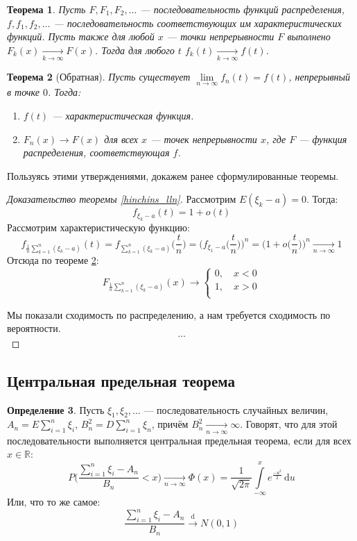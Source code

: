 \documentclass[11pt,openany,a4paper]{scrartcl}
\theoremstyle{plain}
\newtheorem{theorem}{Теорема}[subsection]
\theoremstyle{definition}
\newtheorem{definition}[theorem]{Определение}
\newcommand\mb{\mathbb}
\newcommand\real{\mb R}
\newcommand{\underto}[1]{\xrightarrow[#1]{}}
\newcommand{\overto}[1]{\xrightarrow{#1}}
\newcommand{\dif}{\, \mathrm d}
\begin{document}
\begin{theorem}
    Пусть $F, F_1, F_2, \ldots$ — последовательность функций распределения,
    $f, f_1, f_2, \ldots$ — последовательность соответствующих им 
    характеристических функций. Пусть также для любой $x$ — точки непрерывности 
    $F$ выполнено $F_k(x) \underto{k \to \infty} F(x)$. Тогда для любого $t$
    $f_k(t) \underto{k \to \infty} f(t)$.
\end{theorem}
\begin{theorem}[Обратная]\label{reverse_char_dist}
    Пусть существует $\lim\limits_{n \to \infty} f_n(t) = f(t)$, непрерывный в 
    точке $0$. Тогда:
    \begin{enumerate}
        \item $f(t)$ — характеристическая функция.
        \item $F_n(x) \to F(x)$ для всех $x$ — точек непрерывности $x$, где
        $F$ — функция распределения, соответствующая $f$.
    \end{enumerate}
\end{theorem}

Пользуясь этими утверждениями, докажем ранее сформулированные теоремы.

\begin{proof}[Доказательство теоремы \ref{hinchins_lln}]
    Рассмотрим $E(\xi_k - a) = 0$. Тогда:
    $$
    f_{\xi_k - a}(t) = 1 + o(t)
    $$
    Рассмотрим характеристическую функцию:
    $$
    f_{\frac{1}{n}\sum\limits_{k=1}^n (\xi_k - a)}(t) =
    f_{\sum\limits_{k=1}^n (\xi_k - a)}\bigg(\frac{t}{n}\bigg) =
    \bigg(f_{\xi_1 - a}\bigg(\frac{t}{n}\bigg)\bigg)^n =
    \bigg(1 + o\bigg(\frac{t}{n}\bigg)\bigg)^n \underto{n \to \infty} 1
    $$
    Отсюда по теореме \ref{reverse_char_dist}:
    $$
    F_{\frac{1}{n}\sum\limits_{k=1}^n (\xi_k - a)}(x) \to
    \begin{cases}
        0,\quad x < 0 \\
        1,\quad x > 0 \\
    \end{cases}
    $$
    
    Мы показали сходимость по распределению, а нам требуется сходимость по 
    вероятности.
    $$
    \ldots
    $$
\end{proof}

\subsection{Центральная предельная теорема}

\begin{definition}
    Пусть $\xi_1, \xi_2, \ldots$ — последовательность случайных величин,
    $A_n = E\sum\limits_{i=1}^n\xi_i$, $B_n^2 = D\sum\limits_{i=1}^n\xi_n$, причём
    $B_n^2 \underto{n \to \infty} \infty$. Говорят, что для этой последовательности
    выполняется центральная предельная теорема, если для всех $x \in \real$:
    $$
    P\Bigg(\frac{\sum\limits_{i=1}^n \xi_i - A_n}{B_n} < x\Bigg) \underto{n \to \infty}
    \Phi(x) = \frac{1}{\sqrt{2\pi}}\int\limits_{-\infty}^x e^{\frac{-u^2}{2}}\dif u
    $$
    Или, что то же самое:
    $$
    \frac{\sum\limits_{i=1}^n \xi_i - A_n}{B_n} \overto{\mathrm d} N(0, 1)
    $$
\end{definition}
\end{document}
